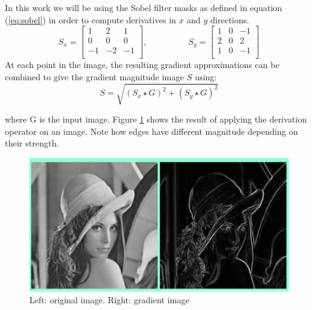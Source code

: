 		In this work we will be using the Sobel filter masks as defined in equation (\ref{eq:sobel}) in order to compute derivatives in $x$ and $y$ directions. 
		\begin{equation}
			S_x =
			 \begin{bmatrix}
     				1	& 2 & 1 \\
    					0	 & 0 & 0 \\
    					-1	 & -2 & -1 \\
				\end{bmatrix},
			\hspace{2cm}
			S_y = 
				\begin{bmatrix}
     				1	& 0 & -1 \\
    					2	 & 0 & 2 \\
    					1	 & 0 & -1 \\
				\end{bmatrix}
			\label{eq:sobel}
			\end{equation}
		At each point in the image, the resulting gradient approximations can be combined to give the gradient magnitude image $S$ using:
		\begin{equation}
			S = \sqrt{(S_x \star G )^2 + (S_y \star G)^2}
			\label{eq:grad_sobel}
		\end{equation}


		where G is the input image. Figure \ref{fig:sobel_demo} shows the result of applying the derivation operator on an image. Note how edges have different magnitude depending on their strength. 

		\begin{figure}
			\centering
			\includegraphics[scale=0.5]{images/lena_orig_sobel.png}
			\caption{Left: original image. Right: gradient image}
			\label{fig:sobel_demo}
		\end{figure}
		
